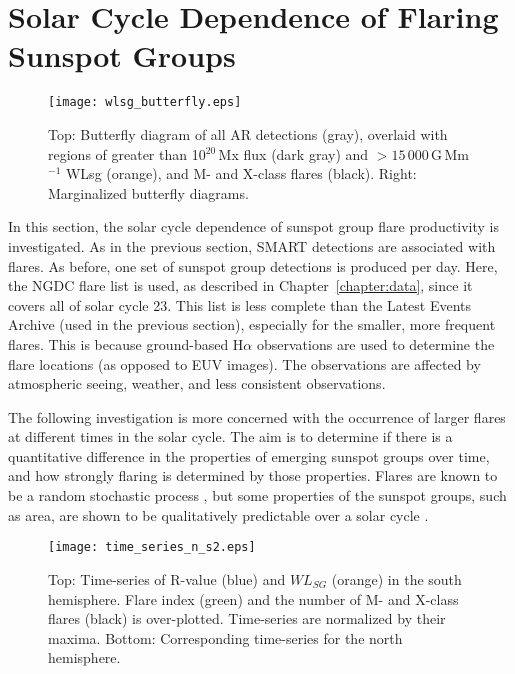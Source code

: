 
\section{Solar Cycle Dependence of Flaring Sunspot Groups}\label{sect:solcycflr}

\begin{figure}[!t]
\centerline{\texttt{[image: wlsg\_butterfly.eps]}}
\caption[AR butterfly diagram showing PSL strength.]{Top: Butterfly diagram of all AR detections (gray), overlaid
with regions of greater than 10$^{20}$\,Mx flux (dark gray) and  $>15\,000$\,G\,Mm$^{-1}$ WLsg (orange),
and M- and X-class flares (black). Right: Marginalized butterfly diagrams.}
\label{fig:flarebutterfly}
\end{figure}

In this section, the solar cycle dependence of sunspot group flare productivity is investigated. As in the previous section, \gls{SMART} detections are associated with flares. As before, one set of sunspot group detections is produced per day. Here, the \gls{NGDC} flare list is used, as described in Chapter~\ref{chapter:data}, since it covers all of solar cycle 23. This list is less complete than the Latest Events Archive (used in the previous section), especially for the smaller, more frequent flares. This is because ground-based H$\alpha$ observations are used to determine the flare locations (as opposed to \gls{EUV} images). The observations are affected by atmospheric seeing, weather, and less consistent observations. 

The following investigation is more concerned with the occurrence of larger flares at different times in the solar cycle. The aim is to determine if there is a quantitative difference in the properties of emerging sunspot groups over time, and how strongly flaring is determined by those properties. Flares are known to be a random stochastic process \citep{Wheatland:2002}, but some properties of the sunspot groups, such as area, are shown to be qualitatively predictable over a solar cycle \citep{Hathaway:2009}. 

\begin{figure}[!t]
\centerline{\texttt{[image: time\_series\_n\_s2.eps]}}
\caption[Sun-averaged AR property time series.]{Top: Time-series of R-value (blue) and $WL_{SG}$ (orange) in the south hemisphere. Flare index (green) and the number of M- and X-class flares (black) is over-plotted. Time-series are normalized by their maxima. Bottom: Corresponding time-series for the north hemisphere.}
\label{fig:flrcmplxtsers}
\end{figure}

